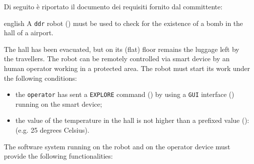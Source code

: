 
Di seguito è riportato il documento dei requisiti fornito dal committente:

\begin{foreigndisplayquote}{english}
  A \texttt{ddr} robot () must be used to check for the existence of a bomb in the hall of a airport.

  The hall has been evacuated, but on its (flat) floor remains the luggage left by the travellers.
  The robot  can be remotely controlled via smart device by an human operator working in a protected area.
  The robot must start its work under the following conditions:

  \begin{itemize}
    \item the \texttt{operator} has sent a \texttt{EXPLORE} command () by using a \texttt{GUI} interface () running on the smart device;
    \item the value of the temperature in the hall is not higher than a prefixed value (): (e.g. 25 degrees Celsius).
  \end{itemize}

  The software system running on the robot and on the operator device must provide the following functionalities:


\end{foreigndisplayquote}
